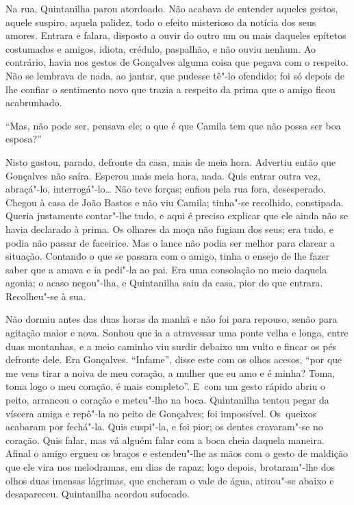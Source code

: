 Na rua, Quintanilha parou atordoado. Não acabava de entender aqueles
gestos, aquele suspiro, aquela palidez, todo o efeito misterioso da
notícia dos seus amores. Entrara e falara, disposto a ouvir do outro um
ou mais daqueles epítetos costumados e amigos, idiota, crédulo,
paspalhão, e não ouviu nenhum. Ao contrário, havia nos gestos de
Gonçalves alguma coisa que pegava com o respeito. Não se lembrava de
nada, ao jantar, que pudesse tê"-lo ofendido; foi só depois de lhe
confiar o sentimento novo que trazia a respeito da prima que o amigo
ficou acabrunhado.

``Mas, não pode ser, pensava ele; o que é que Camila tem que não possa
ser boa esposa?''

Nisto gastou, parado, defronte da casa, mais de meia hora. Advertiu
então que Gonçalves não saíra. Esperou mais meia hora, nada. Quis entrar
outra vez, abraçá"-lo, interrogá"-lo\ldots{} Não teve forças; enfiou pela rua
fora, desesperado. Chegou à casa de João Bastos e não viu Camila;
tinha"-se recolhido, constipada. Queria justamente contar"-lhe tudo, e
aqui é preciso explicar que ele ainda não se havia declarado à prima. Os
olhares da moça não fugiam dos seus; era tudo, e podia não passar de
faceirice. Mas o lance não podia ser melhor para clarear a situação.
Contando o que se passara com o amigo, tinha o ensejo de lhe fazer saber
que a amava e ia pedi"-la ao pai. Era uma consolação no meio daquela
agonia; o acaso negou"-lha, e Quintanilha saiu da casa, pior do que
entrara. Recolheu"-se à sua.

Não dormiu antes das duas horas da manhã e não foi para repouso, senão
para agitação maior e nova. Sonhou que ia a atravessar uma ponte velha e
longa, entre duas montanhas, e a meio caminho viu surdir debaixo um
vulto e fincar os pés defronte dele. Era Gonçalves. ``Infame'', disse
este com os olhos acesos, ``por que me vens tirar a noiva de meu
coração, a mulher que eu amo e é minha? Toma, toma logo o meu coração, é
mais completo''. E~com um gesto rápido abriu o peito, arrancou o coração
e meteu"-lho na boca. Quintanilha tentou pegar da víscera amiga e repô"-la
no peito de Gonçalves; foi impossível. Os~queixos acabaram por fechá"-la.
Quis cuspi"-la, e foi pior; os dentes cravaram"-se no coração. Quis falar,
mas vá alguém falar com a boca cheia daquela maneira. Afinal o amigo
ergueu os braços e estendeu"-lhe as mãos com o gesto de maldição que ele
vira nos melodramas, em dias de rapaz; logo depois, brotaram"-lhe dos
olhos duas imensas lágrimas, que encheram o vale de água, atirou"-se
abaixo e desapareceu. Quintanilha acordou sufocado.

